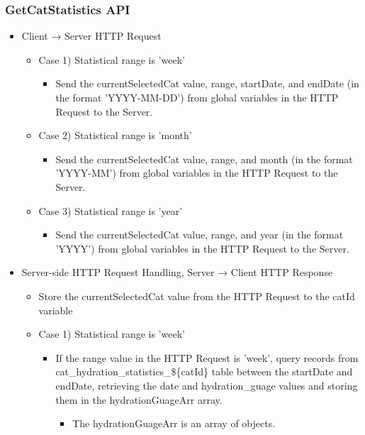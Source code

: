 \documentclass[conference]{IEEEtran}
\begin{document}
\subsubsection{GetCatStatistics API}
\begin{itemize}
    \item Client → Server HTTP Request
    \begin{itemize}
        \item Case 1) Statistical range is 'week' 
        \begin{itemize}
            \item Send the currentSelectedCat value, range, startDate, and endDate (in the format 'YYYY-MM-DD') from global variables in the HTTP Request to the Server.
        \end{itemize}
        \item Case 2) Statistical range is 'month' 
        \begin{itemize}
            \item Send the currentSelectedCat value, range, and month (in the format 'YYYY-MM') from global variables in the HTTP Request to the Server.
        \end{itemize}
        \item Case 3) Statistical range is 'year' 
        \begin{itemize}
            \item Send the currentSelectedCat value, range, and year (in the format 'YYYY') from global variables in the HTTP Request to the Server.
            \\
        \end{itemize}
    \end{itemize}
    \item Server-side HTTP Request Handling, Server → Client HTTP Response
    \begin{itemize}
        \item Store the currentSelectedCat value from the HTTP Request to the catId variable
        \item Case 1) Statistical range is 'week' 
        \begin{itemize}
            \item If the range value in the HTTP Request is 'week', query records from cat\_hydration\_statistics\_\$\{catId\} table between the startDate and endDate, retrieving the date and hydration\_guage values and storing them in the hydrationGuageArr array.
            \begin{itemize}
                \item The hydrationGuageArr is an array of objects.

\end{itemize}
\end{itemize}
\end{itemize}
\end{itemize}
\end{document}
